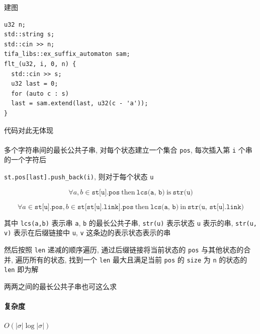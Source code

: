建图

\begin{verbatim}
u32 n;
std::string s;
std::cin >> n;
tifa_libs::ex_suffix_automaton sam;
flt_(u32, i, 0, n) {
  std::cin >> s;
  u32 last = 0;
  for (auto c : s)
  last = sam.extend(last, u32(c - 'a'));
}
\end{verbatim}

代码对此无体现\\
\\

多个字符串间的最长公共子串, 对每个状态建立一个集合 \verb|pos|, 每次插入第 \verb|i| 个串的一个字符后

\verb|st.pos[last].push_back(i)|, 则对于每个状态 \verb|u|

\[
    \forall a,b \in \texttt{st[u].pos}~\text{then}~\texttt{lcs(a, b)}~\text{is}~\texttt{str(u)}
\]

\[
    \forall a\in \texttt{st[u].pos}, b\in \texttt{st[st[u].link].pos}~\text{then}~\texttt{lcs(a, b)} ~\text{in}~ \texttt{str(u, st[u].link)}
\]

其中 \verb|lcs(a,b)| 表示串 \verb|a|, \verb|b| 的最长公共子串, \verb|str(u)| 表示状态 \verb|u| 表示的串, \verb|str(u, v)| 表示在后缀链接中 \verb|u|, \verb|v| 这条边的表示状态表示的串

然后按照 \verb|len| 递减的顺序遍历, 通过后缀链接将当前状态的 \verb|pos| 与其他状态的合并, 遍历所有的状态, 找到一个 \verb|len| 最大且满足当前 \verb|pos| 的 \verb|size| 为 \verb|n| 的状态的 \verb|len| 即为解

两两之间的最长公共子串也可这么求

\paragraph{复杂度} \(O(|\sigma| \log|\sigma|)\)


